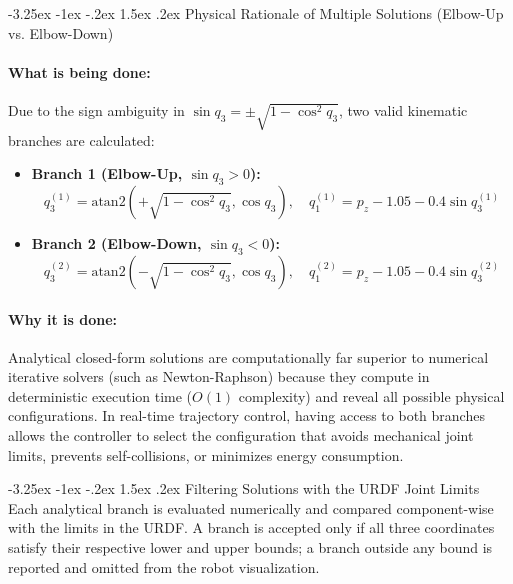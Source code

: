 \documentclass[11pt, a4paper]{article}
\makeatletter
\renewcommand{\subsection}{\@startsection{subsection}{2}{\z@}%
    {-3.25ex \@plus -1ex \@minus -.2ex}%
    {1.5ex \@plus .2ex}%
    {\normalfont\large\bfseries\color{brandaccent}}}
\makeatother
\begin{document}
\subsection{Physical Rationale of Multiple Solutions (Elbow-Up vs. Elbow-Down)}
\paragraph{What is being done:}
Due to the sign ambiguity in $\sin q_3 = \pm \sqrt{1 - \cos^2 q_3}$, two valid kinematic branches are calculated:
\begin{itemize}[leftmargin=1.5em]
    \item \textbf{Branch 1 (Elbow-Up, $\sin q_3 > 0$):}
    \begin{equation}
        q_3^{(1)} = \text{atan2}\left(+\sqrt{1 - \cos^2 q_3}, \cos q_3\right), \quad q_1^{(1)} = p_z - 1.05 - 0.4 \sin q_3^{(1)}
    \end{equation}
    \item \textbf{Branch 2 (Elbow-Down, $\sin q_3 < 0$):}
    \begin{equation}
        q_3^{(2)} = \text{atan2}\left(-\sqrt{1 - \cos^2 q_3}, \cos q_3\right), \quad q_1^{(2)} = p_z - 1.05 - 0.4 \sin q_3^{(2)}
    \end{equation}
\end{itemize}

\paragraph{Why it is done:}
Analytical closed-form solutions are computationally far superior to numerical iterative solvers (such as Newton-Raphson) because they compute in deterministic execution time ($O(1)$ complexity) and reveal all possible physical configurations. In real-time trajectory control, having access to both branches allows the controller to select the configuration that avoids mechanical joint limits, prevents self-collisions, or minimizes energy consumption.

\subsection{Filtering Solutions with the URDF Joint Limits}
Each analytical branch is evaluated numerically and compared component-wise with the limits in the URDF. A branch is accepted only if all three coordinates satisfy their respective lower and upper bounds; a branch outside any bound is reported and omitted from the robot visualization.
\end{document}
